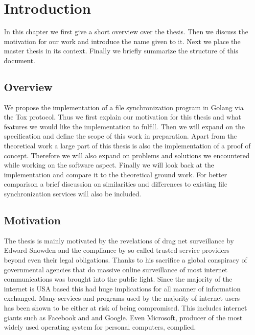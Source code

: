 \chapter{Introduction}
\label{chap:Introduction}

In this chapter we first give a short overview over the thesis.
Then we discuss the motivation for our work and introduce the name given to it.
Next we place the master thesis in its context.
Finally we briefly summarize the structure of this document.

\section{Overview}

We propose the implementation of a file synchronization program in Golang via the Tox protocol.
Thus we first explain our motivation for this thesis and what features we would like the implementation to fulfill.
Then we will expand on the specification and define the scope of this work in preparation.
Apart from the theoretical work a large part of this thesis is also the implementation of a proof of concept.
Therefore we will also expand on problems and solutions we encountered while working on the software aspect.
Finally we will look back at the implementation and compare it to the theoretical ground work.
For better comparison a brief discussion on similarities and differences to existing file synchronization services will also be included.

\section{Motivation}

The thesis is mainly motivated by the revelations of drag net surveillance by Edward Snowden and the compliance by so called trusted service providers beyond even their legal obligations.
Thanks to his sacrifice a global conspiracy of governmental agencies that do massive online surveillance of most internet communications was brought into the public light.
Since the majority of the internet is USA based this had huge implications for all manner of information exchanged.
Many services and programs used by the majority of internet users has been shown to be either at risk of being compromised.
This includes internet giants such as Facebook and and Google\cite{web:site:tg:internet_giants}.
Even Microsoft, producer of the most widely used operating system for personal computers, complied\cite{web:site:tg:microsoft}.

